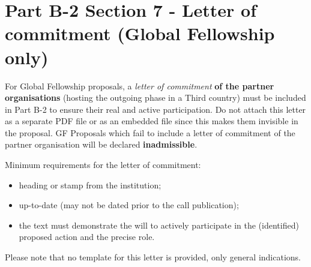 \newpage
\section{Part B-2 Section 7 - Letter of commitment (Global Fellowship only)}
\label{sec:letters}

For Global Fellowship proposals, a {\em letter of commitment} \textbf{of the partner
organisations} (hosting the outgoing phase in a Third country) must be included in Part
B-2 to ensure their real and active participation. 
Do not attach this letter as a separate PDF file or as an
embedded file since this makes them invisible in the proposal. GF Proposals which fail to
include a letter of commitment of the partner organisation will be declared \textbf{inadmissible}.

\medskip\noindent
Minimum requirements for the letter of commitment:

\begin{itemize}
  \item heading or stamp from the institution;
  \item up-to-date (may not be dated prior to the call publication);
  \item the text must demonstrate the will to actively participate in the (identified) proposed action and the precise role.
\end{itemize}

\noindent
Please note that no template for this letter is provided, only general indications.

